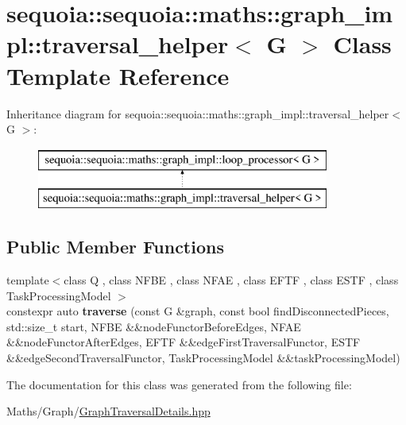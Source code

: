 \hypertarget{classsequoia_1_1sequoia_1_1maths_1_1graph__impl_1_1traversal__helper}{}\section{sequoia\+::sequoia\+::maths\+::graph\+\_\+impl\+::traversal\+\_\+helper$<$ G $>$ Class Template Reference}
\label{classsequoia_1_1sequoia_1_1maths_1_1graph__impl_1_1traversal__helper}
Inheritance diagram for sequoia\+::sequoia\+::maths\+::graph\+\_\+impl\+::traversal\+\_\+helper$<$ G $>$\+:\begin{figure}[H]
\begin{center}
\leavevmode
\includegraphics[height=2.000000cm]{classsequoia_1_1sequoia_1_1maths_1_1graph__impl_1_1traversal__helper}
\end{center}
\end{figure}
\subsection*{Public Member Functions}
\begin{DoxyCompactItemize}
\item 
\mbox{\label{classsequoia_1_1sequoia_1_1maths_1_1graph__impl_1_1traversal__helper_a4a3a2cfc1a87194336d1016aca4ad13e}} 
{\footnotesize template$<$class Q , class N\+F\+BE , class N\+F\+AE , class E\+F\+TF , class E\+S\+TF , class Task\+Processing\+Model $>$ }\\constexpr auto {\bfseries traverse} (const G \&graph, const bool find\+Disconnected\+Pieces, std\+::size\+\_\+t start, N\+F\+BE \&\&node\+Functor\+Before\+Edges, N\+F\+AE \&\&node\+Functor\+After\+Edges, E\+F\+TF \&\&edge\+First\+Traversal\+Functor, E\+S\+TF \&\&edge\+Second\+Traversal\+Functor, Task\+Processing\+Model \&\&task\+Processing\+Model)
\end{DoxyCompactItemize}


The documentation for this class was generated from the following file\+:\begin{DoxyCompactItemize}
\item 
Maths/\+Graph/\mbox{\hyperlink{_graph_traversal_details_8hpp}{Graph\+Traversal\+Details.\+hpp}}\end{DoxyCompactItemize}
